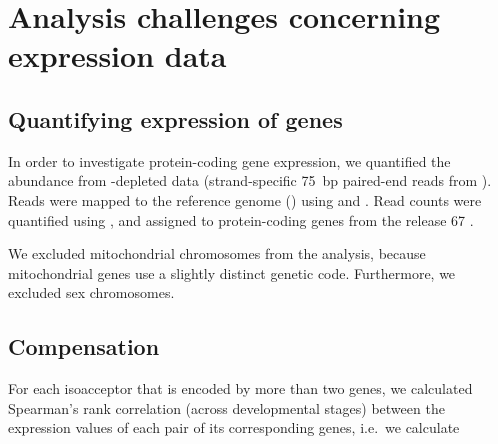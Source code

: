 \chapter{Analysis challenges concerning  expression data}
\label{sec:trna-analysis}

\section{Quantifying expression of \mrna genes}

In order to investigate protein-coding gene expression, we quantified the \mrna
abundance from \rrna-depleted \rnaseq data (strand-specific \SI{75}{bp}
paired-end reads from  ). Reads were mapped to
the \mmu reference genome () using 
\citep{Fonseca:2014} and  \citep{Kim:2013}. Read counts were
quantified using  \citep{Anders:2014}, and assigned to
protein-coding genes from the  release \num{67}
\citep{Flicek:2014}.

We excluded mitochondrial chromosomes from the analysis, because mitochondrial
genes use a slightly distinct genetic code. Furthermore, we excluded
sex chromosomes.

%
%
%

\section{Compensation}

For each isoacceptor that is encoded by more than two \trna genes, we calculated
Spearman’s rank correlation (across developmental stages) between the expression
values of each pair of its corresponding \trna genes, i.e.\ we calculate

